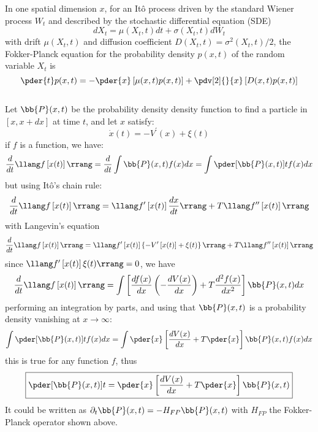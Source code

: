  In one spatial dimension $x$, for an Itô process driven by the standard Wiener process $W_t$ and described by the stochastic differential equation (SDE)
$$ dX_t = \mu(X_t,t) dt + \sigma(X_t,t) dW_t $$
with drift $\mu(X_t,t)$ and diffusion coefficient $D(X_t,t) = \sigma^2(X_t,t)/2$, the Fokker-Planck equation for the probability density $p(x,t)$ of the random variable $X_t$ is
$$ \pder{t} p(x,t) = - \pder{x} \left[ \mu(x,t) p(x,t) \right] + \pdv[2]{}{x} \left[ D(x,t) p(x,t) \right] $$
\\
Let $\bb{P}(x,t)$ be the probability density density function to find a particle in $\left[x, x + dx\right]$ at time $t$, and let $x$ satisfy:
$$ \dot{x}(t) = -V^\prime(x) + \xi (t) $$
if $f$ is a function, we have:
$$ \frac{d}{dt} \llang f\left[ x(t) \right] \rrang = \frac{d}{dt} \int \bb{P}(x,t) f(x) dx = \int \pder[\bb{P}(x,t)]{t} f(x) dx $$
but using Itô's chain rule:
$$ \frac{d}{dt} \llang f\left[x(t)\right] \rrang = \llang f^\prime \left[ x(t) \right] \frac{dx}{dt} \rrang + T \llang f^{\prime\prime} \left[ x(t) \right] \rrang $$
with Langevin's equation
$$ \frac{d}{dt} \llang f\left[x(t)\right] \rrang = \llang f^\prime \left[ x(t) \right] \left\{ - V^\prime \left[ x(t) \right] + \xi(t) \right\} \rrang + T \llang f^{\prime\prime} \left[ x(t) \right] \rrang $$
since $\llang f^\prime \left[ x(t) \right] \xi(t) \rrang = 0$, we have
$$ \frac{d}{dt} \llang f \left[ x(t) \right] \rrang = \int \left[ \frac{df(x)}{dx} \left( - \frac{dV(x)}{dx} \right) + T \frac{d^2 f(x)}{dx^2} \right] \bb{P}(x,t) dx $$
performing an integration by parts, and using that $\bb{P}(x,t)$ is a probability density vanishing at $x\to\infty$:
$$ \int \pder[\bb{P}(x,t)]{t} f(x) dx = \int \pder{x} \left[ \frac{dV(x)}{dx} + T \pder{x} \right] \bb{P}(x,t) f(x) dx $$
this is true for any function $f$, thus
$$ \boxed{ \pder[\bb{P}(x,t)]{t} = \pder{x} \left[ \frac{dV(x)}{dx} + T \pder{x} \right] \bb{P}(x,t) } $$
It could be written as $\partial_t \bb{P}(x,t) = - H_{FP} \bb{P}(x,t)$ with $H_{FP}$ the Fokker-Planck operator shown above.
